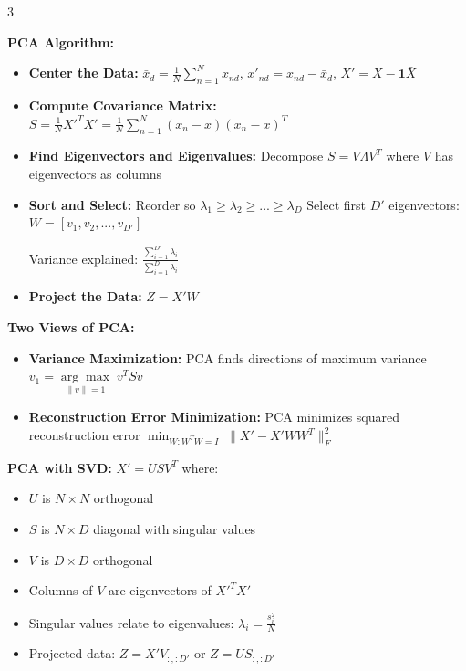 \documentclass[10pt,landscape]{article}
\begin{document}
\begin{multicols}{3}
\begin{tcolorbox}[breakable, title=Principal Component Analysis (PCA), colback=pca, boxsep=1pt, left=1pt, right=1pt, top=1pt, bottom=1pt]
\textbf{PCA Algorithm:}
\begin{itemize}[leftmargin=*,noitemsep,topsep=0pt]
    \item \textbf{Center the Data:}
    $\bar{x}_d = \frac{1}{N}\sum_{n=1}^N x_{nd}$, 
    $x'_{nd} = x_{nd} - \bar{x}_d$, 
    $X' = X - \mathbf{1}\bar{X}$
    
    \item \textbf{Compute Covariance Matrix:}
    $S = \frac{1}{N}X'^T X' = \frac{1}{N}\sum_{n=1}^N (x_n - \bar{x})(x_n - \bar{x})^T$
    
    \item \textbf{Find Eigenvectors and Eigenvalues:}
    Decompose $S = V\Lambda V^T$ where $V$ has eigenvectors as columns
    
    \item \textbf{Sort and Select:}
    Reorder so $\lambda_1 \geq \lambda_2 \geq ... \geq \lambda_D$
    Select first $D'$ eigenvectors: $W = [v_1, v_2, ..., v_{D'}]$
    
    Variance explained: $\frac{\sum_{i=1}^{D'} \lambda_i}{\sum_{i=1}^D \lambda_i}$
    
    \item \textbf{Project the Data:}
    $Z = X'W$
\end{itemize}

\textbf{Two Views of PCA:}
\begin{itemize}[leftmargin=*,noitemsep,topsep=0pt]
    \item \textbf{Variance Maximization:} PCA finds directions of maximum variance
    $v_1 = \underset{\|v\|=1}{\arg\max} \; v^T S v$
    
    \item \textbf{Reconstruction Error Minimization:} PCA minimizes squared reconstruction error
    $\min_{W: W^T W = I} \; \|X' - X'WW^T\|_F^2$
\end{itemize}

\textbf{PCA with SVD:}
$X' = USV^T$ where:
\begin{itemize}[leftmargin=*,noitemsep,topsep=0pt]
    \item $U$ is $N \times N$ orthogonal
    \item $S$ is $N \times D$ diagonal with singular values
    \item $V$ is $D \times D$ orthogonal
    
    \item Columns of $V$ are eigenvectors of $X'^T X'$
    \item Singular values relate to eigenvalues: $\lambda_i = \frac{s_i^2}{N}$
    \item Projected data: $Z = X'V_{:,:D'}$ or $Z = US_{:,:D'}$
\end{itemize}
\end{tcolorbox}


\end{multicols}
\end{document}
